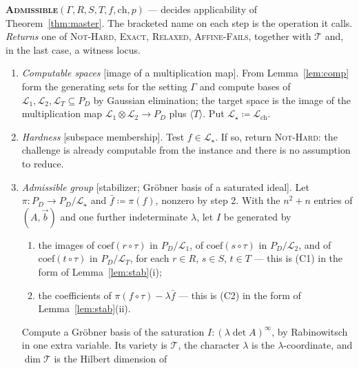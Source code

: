 \documentclass{aicr-solution}
\newcommand{\vb}{\vec{b}}
\newcommand{\LL}{\mathcal{L}}
\newcommand{\Span}[1]{\langle #1 \rangle} %
\newcommand{\ch}{\mathrm{ch}}
\begin{document}
\begin{procedurebox}
\textbf{\textsc{Admissible}}$(\Gamma,R,S,T,f,\ch,p)$ --- decides applicability of
Theorem~\ref{thm:master}. The bracketed name on each step is the operation it calls.\\[2pt]
\emph{Returns} one of \textsc{Not-Hard}, \textsc{Exact}, \textsc{Relaxed},
\textsc{Affine-Fails}, together with $\mathcal T$ and, in the last case, a witness locus.
\begin{enumerate}[label=\textup{\arabic*.},leftmargin=2.2em,itemsep=3pt]
  \item \emph{Computable spaces} \textup{[image of a multiplication map]}. From
        Lemma~\ref{lem:comp} form the generating sets for the setting $\Gamma$ and compute bases
        of $\LL_1,\LL_2,\LL_T\subseteq P_D$ by Gaussian elimination; the target space is the
        image of the multiplication map $\LL_1\otimes\LL_2\to P_D$ plus $\Span{T}$. Put
        $\LL_\star\coloneqq\LL_{\ch}$.
  \item \emph{Hardness} \textup{[subspace membership]}. Test $f\in\LL_\star$. If so, return
        \textsc{Not-Hard}: the challenge is already computable from the instance and there is
        no assumption to reduce.
  \item \emph{Admissible group} \textup{[stabilizer; Gr\"obner basis of a saturated ideal]}. Let
        $\pi\colon P_D\to P_D/\LL_\star$ and $\bar f\coloneqq\pi(f)$, nonzero by step 2. With
        the $n^{2}+n$ entries of $(A,\vb)$ and one further indeterminate $\lambda$, let $I$ be
        generated by
        \begin{enumerate}[label=\textup{(\alph*)},leftmargin=2.2em,topsep=2pt,itemsep=1pt]
          \item the images of $\mathrm{coef}(r\circ\tau)$ in $P_D/\LL_1$, of
                $\mathrm{coef}(s\circ\tau)$ in $P_D/\LL_2$, and of $\mathrm{coef}(t\circ\tau)$
                in $P_D/\LL_T$, for each $r\in R$, $s\in S$, $t\in T$ --- this is
                \textup{(C1)} in the form of Lemma~\ref{lem:stab}(i);
          \item the coefficients of $\pi(f\circ\tau)-\lambda\bar f$ --- this is \textup{(C2)}
                in the form of Lemma~\ref{lem:stab}(ii).
        \end{enumerate}
        Compute a Gr\"obner basis of the saturation $I:(\lambda\det A)^{\infty}$, by
        Rabinowitsch in one extra variable. Its variety is $\mathcal T$, the character
        $\lambda$ is the $\lambda$-coordinate, and $\dim\mathcal T$ is the Hilbert dimension of

\end{enumerate}
\end{procedurebox}
\end{document}

